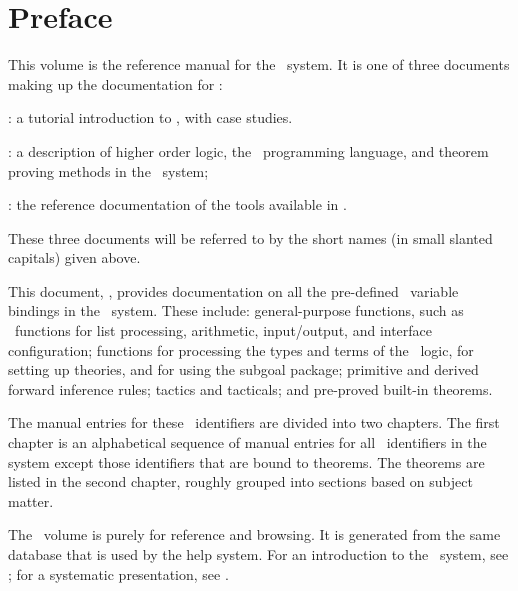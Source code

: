 \chapter*{Preface}

This volume is the reference manual for the \HOL\ system. 
It is one of three documents making up the documentation for \HOL:

\begin{myenumerate}
\item \TUTORIAL: a tutorial introduction to \HOL, with case studies.
\item \DESCRIPTION: a description of higher order logic,
the \ML\ programming language, and theorem proving methods in the \HOL\ system;
\item \REFERENCE: the reference documentation of the tools available in \HOL.
\end{myenumerate}


\noindent These three documents will be referred to by the short names (in
small slanted capitals) given above.

This document, \REFERENCE, provides documentation on all the pre-defined \ML\
variable bindings in the \HOL\ system.  These include: general-purpose
functions, such as \ML\ functions for list processing, arithmetic,
input/output, and interface configuration; functions for processing the types
and terms of the \HOL\ logic, for setting up theories, and for using the
subgoal package; primitive and derived forward inference rules; tactics and
tacticals; and pre-proved built-in theorems.

The manual entries for these \ML\ identifiers are divided into two chapters.
The first chapter is an alphabetical sequence of manual entries for all \ML\
identifiers in the system except those identifiers that are bound to theorems.
The theorems are listed in the second chapter, roughly grouped into sections
based on subject matter.

The \REFERENCE\ volume is purely for reference and browsing. It is generated
from the same database that is used by the help system. For an introduction to
the \HOL\ system, see \TUTORIAL; for a systematic presentation, see
\DESCRIPTION.






